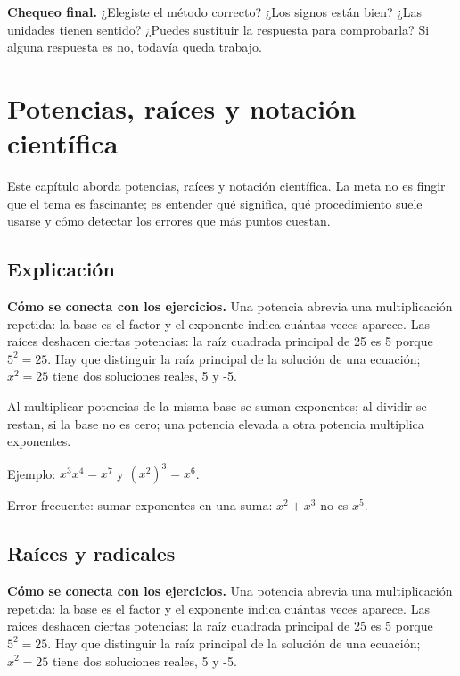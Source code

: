 \documentclass[10pt,oneside,openany]{book}
\begin{document}
\begin{idea}\textbf{Chequeo final.} ¿Elegiste el método correcto? ¿Los signos están bien? ¿Las unidades tienen sentido? ¿Puedes sustituir la respuesta para comprobarla? Si alguna respuesta es no, todavía queda trabajo.\end{idea}



\chapter{Potencias, raíces y notación científica}

\begin{idea}
Este capítulo aborda potencias, raíces y notación científica. La meta no es fingir que el tema es fascinante; es entender qué significa, qué procedimiento suele usarse y cómo detectar los errores que más puntos cuestan.
\end{idea}

\section{Explicación}

\textbf{Cómo se conecta con los ejercicios.} Una potencia abrevia una multiplicación repetida: la base es el factor y el exponente indica cuántas veces aparece. Las raíces deshacen ciertas potencias: la raíz cuadrada principal de 25 es 5 porque $5^2 = 25$. Hay que distinguir la raíz principal de la solución de una ecuación; $x^2 = 25$ tiene dos soluciones reales, 5 y -5.

Al multiplicar potencias de la misma base se suman exponentes; al dividir se restan, si la base no es cero; una potencia elevada a otra potencia multiplica exponentes.



\begin{ejemplo}
Ejemplo: $x^3x^4=x^7$ y $(x^2)^3=x^6$.
\end{ejemplo}

\begin{ojo}
Error frecuente: sumar exponentes en una suma: $x^2+x^3$ no es $x^5$.
\end{ojo}



\section{Raíces y radicales}

\textbf{Cómo se conecta con los ejercicios.} Una potencia abrevia una multiplicación repetida: la base es el factor y el exponente indica cuántas veces aparece. Las raíces deshacen ciertas potencias: la raíz cuadrada principal de 25 es 5 porque $5^2 = 25$. Hay que distinguir la raíz principal de la solución de una ecuación; $x^2 = 25$ tiene dos soluciones reales, 5 y -5.
\end{document}
